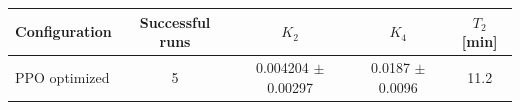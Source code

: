 \begin{tabular}{lcccc}
\toprule
Configuration & Successful runs & $K_2$ & $K_4$ & $T_2$ [min] \\
\midrule
PPO optimized & 5 & 0.004204 $\pm$ 0.00297 & 0.0187 $\pm$ 0.0096 & 11.2 \\
\bottomrule
\end{tabular}
